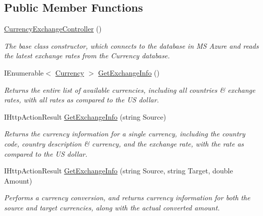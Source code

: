 \subsection*{Public Member Functions}
\begin{DoxyCompactItemize}
\item 
\hyperlink{class_currency_info_1_1_controllers_1_1_currency_exchange_controller_abdde30eb16f34e9b8efe3bd3707c345f}{Currency\-Exchange\-Controller} ()
\begin{DoxyCompactList}\small\item\em The base class constructor, which connects to the database in M\-S Azure and reads the latest exchange rates from the Currency database. \end{DoxyCompactList}\item 
I\-Enumerable$<$ \hyperlink{class_currency_info_1_1_models_1_1_currency}{Currency} $>$ \hyperlink{class_currency_info_1_1_controllers_1_1_currency_exchange_controller_a6f81ee9304e4ebd3e14345dad597ca29}{Get\-Exchange\-Info} ()
\begin{DoxyCompactList}\small\item\em Returns the entire list of available currencies, including all countries \& exchange rates, with all rates as compared to the U\-S dollar. \end{DoxyCompactList}\item 
I\-Http\-Action\-Result \hyperlink{class_currency_info_1_1_controllers_1_1_currency_exchange_controller_abce33a51737575f87fc5ebbe0b777676}{Get\-Exchange\-Info} (string Source)
\begin{DoxyCompactList}\small\item\em Returns the currency information for a single currency, including the country code, country description \& currency, and the exchange rate, with the rate as compared to the U\-S dollar. \end{DoxyCompactList}\item 
I\-Http\-Action\-Result \hyperlink{class_currency_info_1_1_controllers_1_1_currency_exchange_controller_a984cea6f032bc6c7664e9058017a26e9}{Get\-Exchange\-Info} (string Source, string Target, double Amount)
\begin{DoxyCompactList}\small\item\em Performs a currency conversion, and returns currency information for both the source and target currencies, along with the actual converted amount. \end{DoxyCompactList}\end{DoxyCompactItemize}


